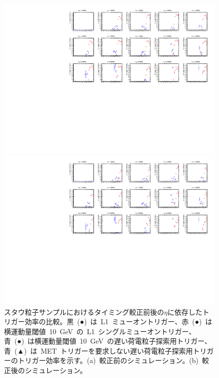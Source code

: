 \begin{figure}[tbp]
    \begin{minipage}{0.49\hsize}
    \centering   
    \includegraphics[width=\textwidth,page=9]{img/rec/stau_600_ori.pdf}
    \subcaption{}
    \end{minipage}
    \begin{minipage}{0.49\hsize}
    \centering   
    \includegraphics[width=\textwidth,page=9]{img/rec/stau_600.pdf}
    \subcaption{}
    \end{minipage}
    \caption[スタウ粒子サンプルにおけるタイミング較正前後の$\eta$に依存したトリガー効率の比較]{スタウ粒子サンプルにおけるタイミング較正前後の$\eta$に依存したトリガー効率の比較。黒~(●)~は~L1~ミューオントリガー、赤~(●)~は横運動量閾値~10~GeV~の~L1~シングルミューオントリガー、青~(●)~は横運動量閾値~10~GeV~の遅い荷電粒子探索用トリガー、青~(▲)~は~MET~トリガーを要求しない遅い荷電粒子探索用トリガーのトリガー効率を示す。(a)~較正前のシミュレーション。(b)~較正後のシミュレーション。}\label{fig:trieta}
\end{figure}

